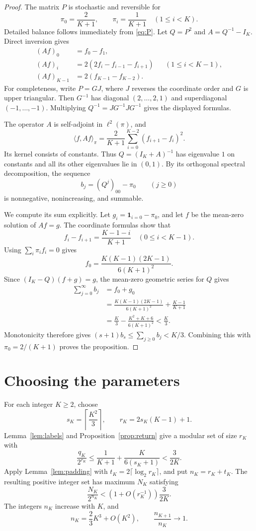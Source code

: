 \documentclass[reqno]{amsart}
\theoremstyle{remark}
\numberwithin{equation}{section}
\begin{document}
\begin{proof}
The matrix $P$ is stochastic and reversible for
\[
 \pi_0=\frac2{K+1},\qquad \pi_i=\frac1{K+1}\quad(1\leq i<K).
\]
Detailed balance follows immediately from \eqref{eq:P}.
Let $Q=P^2$ and $A=Q^{-1}-I_K$. Direct inversion gives
\begin{align*}
 (Af)_0&=f_0-f_1,\\
 (Af)_i&=2(2f_i-f_{i-1}-f_{i+1}) &&(1\leq i<K-1),\\
 (Af)_{K-1}&=2(f_{K-1}-f_{K-2}).
\end{align*}
For completeness, write $P=GJ$, where $J$ reverses the coordinate order
and $G$ is upper triangular. Then $G^{-1}$ has diagonal
$(2,\ldots,2,1)$ and superdiagonal $(-1,\ldots,-1)$.
Multiplying $Q^{-1}=JG^{-1}JG^{-1}$ gives the displayed formulas.

The operator $A$ is self-adjoint in $\ell^2(\pi)$, and
\[
 \langle f,Af\rangle_\pi
 =\frac2{K+1}\sum_{i=0}^{K-2}(f_{i+1}-f_i)^2.
\]
Its kernel consists of constants. Thus $Q=(I_K+A)^{-1}$ has eigenvalue
$1$ on constants and all its other eigenvalues lie in $(0,1)$.
By its orthogonal spectral decomposition, the sequence
\[
 b_j=(Q^j)_{00}-\pi_0\qquad(j\geq0)
\]
is nonnegative, nonincreasing, and summable.

We compute its sum explicitly. Let $g_i=\boldsymbol{1}_{i=0}-\pi_0$, and
let $f$ be the mean-zero solution of $Af=g$. The coordinate formulas show
that
\[
 f_i-f_{i+1}=\frac{K-1-i}{K+1}\quad(0\leq i<K-1).
\]
Using $\sum_i\pi_i f_i=0$ gives
\[
 f_0=\frac{K(K-1)(2K-1)}{6(K+1)^2}.
\]
Since $(I_K-Q)(f+g)=g$, the mean-zero geometric series for $Q$ gives
\begin{align*}
 \sum_{j=0}^{\infty} b_j
 &=f_0+g_0\\
 &=\frac{K(K-1)(2K-1)}{6(K+1)^2}+\frac{K-1}{K+1}\\
 &=\frac K3-\frac{K^2+K+6}{6(K+1)^2}
 <\frac K3.
\end{align*}
Monotonicity therefore gives
$(s+1)b_s\leq\sum_{j\geq0}b_j<K/3$.
Combining this with $\pi_0=2/(K+1)$ proves the proposition.
\end{proof}

\section{Choosing the parameters}

For each integer $K\geq2$, choose
\[
 s_K=\left\lceil\frac{K^2}{3}\right\rceil,\qquad
 r_K=2s_K(K-1)+1.
\]
Lemma~\ref{lem:labels} and Proposition~\ref{prop:return} give a modular
set of size $r_K$ with
\begin{equation}\label{eq:modbound}
 \frac{q_K}{2^{r_K}}
 \leq\frac1{K+1}+\frac{K}{6(s_K+1)}
 <\frac{3}{2K}.
\end{equation}
Apply Lemma~\ref{lem:padding} with
$t_K=2\lceil\log_2 r_K\rceil$, and put $n_K=r_K+t_K$.
The resulting positive integer set has maximum $N_K$ satisfying
\[
 \frac{N_K}{2^{n_K}}
 <\left(1+O(r_K^{-1})\right)\frac{3}{2K}.
\]
The integers $n_K$ increase with $K$, and
\[
 n_K=\frac23K^3+O(K^2),\qquad
 \frac{n_{K+1}}{n_K}\longrightarrow1.
\]
\end{document}
